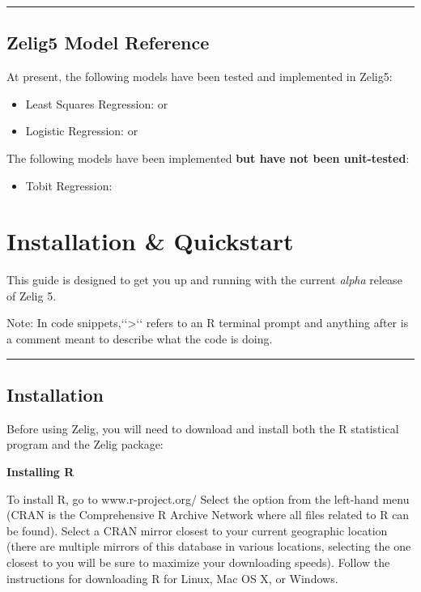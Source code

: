\documentclass[letterpaper,10pt,english]{sphinxmanual}
\begin{document}
\bigskip\hrule{}\bigskip



\section{Zelig5 Model Reference}
\label{quickstart:modelreference}\label{quickstart:zelig5-model-reference}
At present, the following models have been tested and implemented in Zelig5:
\begin{itemize}
\item {} 
Least Squares Regression:  or 

\item {} 
Logistic Regression:  or 

\end{itemize}

The following models have been implemented \textbf{but have not been unit-tested}:
\begin{itemize}
\item {} 
Tobit Regression:

\end{itemize}


\chapter{Installation \& Quickstart}
\label{installation:installation}\label{installation::doc}\label{installation:installation-quickstart}
This guide is designed to get you up and running with the current \emph{alpha} release of Zelig 5.

Note: In code snippets,{}`{}`\textgreater{}{}`{}` refers to an R terminal prompt and anything after \code{\#} is a comment meant to describe what the code is doing.


\bigskip\hrule{}\bigskip



\section{Installation}
\label{installation:id1}
Before using Zelig, you will need to download and install both the R statistical program and the Zelig package:

\textbf{Installing R}

To install R, go to www.r-project.org/  Select the  option from the left-hand menu (CRAN is the Comprehensive R Archive Network where all files related to R can be found). Select a CRAN mirror closest to your current geographic location (there are multiple mirrors of this database in various locations, selecting the one closest to you will be sure to maximize your downloading speeds).  Follow the instructions for downloading R for Linux, Mac OS X, or Windows.
\end{document}
